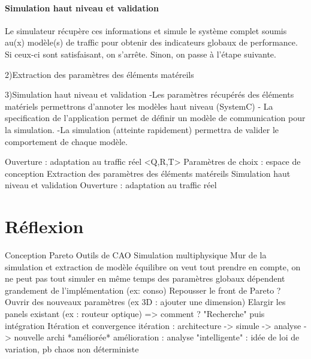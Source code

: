 \documentclass[11pt]{article}
\begin{document}
\paragraph{Simulation haut niveau et validation}
Le simulateur récupère ces informations et simule le système complet soumis au(x) modèle(s) de traffic pour obtenir des indicateurs globaux de performance. Si ceux-ci sont satisfaisant, on s'arrête. Sinon, on passe à l'étape suivante.

	

    2)Extraction des paramètres des éléments matéreils

    3)Simulation haut niveau et validation
	-Les paramètres récupérés des éléments matériels permettrons d'annoter les modèles haut niveau (SystemC)
	- La specification de l'application permet de définir un modèle de communication pour la simulation.
	-La simulation (atteinte rapidement) permettra de valider le comportement de chaque modèle. 
	

    Ouverture : adaptation au traffic réel
	<Q,R,T>
	Paramètres de choix : espace de conception
	Extraction des paramètres des éléments matéreils
	Simulation haut niveau et validation
	Ouverture : adaptation au traffic réel

\section{Réflexion}
	Conception
	Pareto
	Outils de CAO
	Simulation multiphysique
	Mur de la simulation et extraction de modèle
		équilibre on veut tout prendre en compte, on ne peut pas tout simuler en même temps
		des paramètres globaux dépendent grandement de l'implémentation (ex: conso)
	Repousser le front de Pareto ?
		Ouvrir des nouveaux paramètres (ex 3D : ajouter une dimension)
		Elargir les panels existant (ex : routeur optique)
		=> comment ? "Recherche" puis intégration
	Itération et convergence
		itération : architecture -> simule -> analyse -> nouvelle archi *améliorée*
		amélioration : analyse "intelligente" : idée de loi de variation, pb chaos non déterministe
\end{document}
